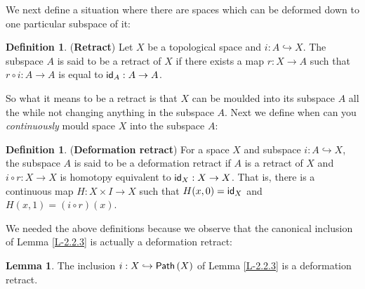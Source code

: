 \documentclass[letterpaper,11pt,twoside]{article}
\theoremstyle{definition}
\theoremstyle{definition}
\newtheorem{definition}[proposition]{Definition}
\theoremstyle{definition}
\theoremstyle{definition}
\newtheorem{lemma}[proposition]{\textbf{Lemma}}
\theoremstyle{definition}
\theoremstyle{definition}
\theoremstyle{remark}
\theoremstyle{definition}
\newcommand{\id}[1]{{\fontfamily{lmss}\selectfont 
		\text{id}_{#1}
}}
\newcommand{\upps}[1]{{\fontfamily{lmss}\selectfont 
		\text{Path}\left(#1\right)
}}
\begin{document}
    We next define a situation where there are spaces which can be deformed down to one particular subspace of it:
    \begin{definition}
    (\textbf{Retract}) Let $X$ be a topological space and $i : A\hookrightarrow X$. The subspace $A$ is said to be a retract of $X$ if there exists a map $r : X\to A$ such that $r\circ i :A\to A$ is equal to $\id{A} : A\to A$. 
    \end{definition}
    So what it means to be a retract is that $X$ can be moulded into its subspace $A$ all the while not changing anything in the subspace $A$. Next we define when can you \textit{continuously} mould space $X$ into the subspace $A$:
    \begin{definition}
    (\textbf{Deformation retract}) For a space $X$ and subspace $i : A\hookrightarrow X$, the subspace $A$ is said to be a deformation retract if $A$ is a retract of $X$ and $i\circ r : X\to X$ is homotopy equivalent to $\id{X} : X\to X$. That is, there is a continuous map $H : X\times I \to X$ such that $H(x,0)= \id{X}$ and $H(x,1)= (i\circ r)(x)$.
    \end{definition}
    We needed the above definitions because we observe that the canonical inclusion of Lemma \ref{L-2.2.3} is actually a deformation retract:
    \begin{lemma}\label{L-2.2.6}
    The inclusion $i : X\hookrightarrow \upps{X}$ of Lemma \ref{L-2.2.3} is a deformation retract.
    \end{lemma}
\end{document}
